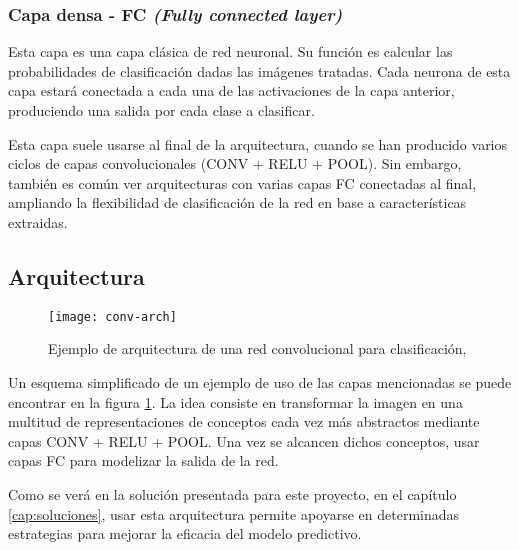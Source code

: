 \subsubsection{Capa densa - FC \textit{(Fully connected layer)}}

Esta capa es una capa clásica de red neuronal. Su función es calcular las probabilidades de clasificación dadas las imágenes tratadas. Cada neurona de esta capa estará conectada a cada una de las activaciones de la capa anterior, produciendo una salida por cada clase a clasificar.

Esta capa suele usarse al final de la arquitectura, cuando se han producido varios ciclos de capas convolucionales (CONV + RELU + POOL). Sin embargo, también es común ver arquitecturas con varias capas FC conectadas al final, ampliando la flexibilidad de clasificación de la red en base a características extraidas.

\subsection{Arquitectura}
\label{sec:conv-net-arch}

\begin{figure}
    \centering
    \caption{Ejemplo de arquitectura de una red convolucional para clasificación, \parencite{clarifai}}
\label{conv-arch}
  \texttt{[image: conv-arch]}
\end{figure}

Un esquema simplificado de un ejemplo de uso de las capas mencionadas se puede
encontrar en la figura \ref{conv-arch}. La idea consiste en transformar la
imagen en una multitud de representaciones de conceptos cada vez más abstractos
mediante capas CONV + RELU + POOL. Una vez se alcancen dichos conceptos, usar
capas FC para modelizar la salida de la red.

Como se verá en la solución presentada para este proyecto, en el capítulo \ref{cap:soluciones}, usar esta arquitectura permite apoyarse en determinadas estrategias para mejorar la eficacia del modelo predictivo.
